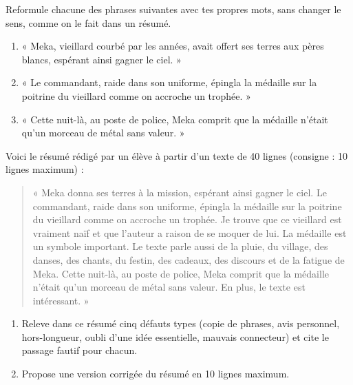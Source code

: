 \documentclass[11pt]{article}
\newcounter{popsec}
\newcounter{popsub}
\newcommand{\courssub}[1]{%
  \stepcounter{popsub}%
  \par\vspace{9pt}\noindent{\popxbold\fontsize{11.5}{13}\selectfont\color{popink}{\color{poporange}\thepopsec.\thepopsub}\hspace{6pt}#1}\par\nopagebreak\vspace{4pt}
}
\begin{document}
\begin{exercice}[Reformulation]
Reformule chacune des phrases suivantes avec tes propres mots, sans changer le sens, comme on le fait dans un résumé.
\begin{enumerate}
\item « Meka, vieillard courbé par les années, avait offert ses terres aux pères blancs, espérant ainsi gagner le ciel. »
\item « Le commandant, raide dans son uniforme, épingla la médaille sur la poitrine du vieillard comme on accroche un trophée. »
\item « Cette nuit-là, au poste de police, Meka comprit que la médaille n'était qu'un morceau de métal sans valeur. »
\end{enumerate}
\end{exercice}

\begin{exercice}
Voici le résumé rédigé par un élève à partir d'un texte de 40 lignes (consigne : 10 lignes maximum) :
\begin{quote}
« Meka donna ses terres à la mission, espérant ainsi gagner le ciel. Le commandant, raide dans son uniforme, épingla la médaille sur la poitrine du vieillard comme on accroche un trophée. Je trouve que ce vieillard est vraiment naïf et que l'auteur a raison de se moquer de lui. La médaille est un symbole important. Le texte parle aussi de la pluie, du village, des danses, des chants, du festin, des cadeaux, des discours et de la fatigue de Meka. Cette nuit-là, au poste de police, Meka comprit que la médaille n'était qu'un morceau de métal sans valeur. En plus, le texte est intéressant. »
\end{quote}
\begin{enumerate}
\item Releve dans ce résumé cinq défauts types (copie de phrases, avis personnel, hors-longueur, oubli d'une idée essentielle, mauvais connecteur) et cite le passage fautif pour chacun.
\item Propose une version corrigée du résumé en 10 lignes maximum.
\end{enumerate}
\end{exercice}

\courssub{Je me prépare au Bac}
\end{document}
